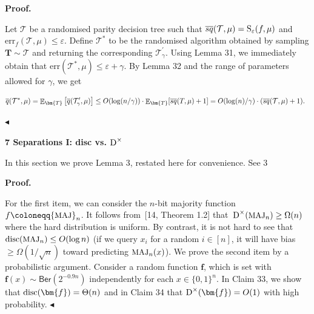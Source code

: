 \documentclass[10pt,a4paper]{article}
\begin{document}
\par\medskip\noindent\textbf{Proof.}\par




Let $\mathcal{T}$ be a randomised parity decision tree such that $\mathop{\overline{sq}}(\mathcal{T},\mu)={\textup{S}}_{\varepsilon}(f,\mu)$ and $\mathrm{err}_{f}(\mathcal{T},\mu)\leq\varepsilon$. Define $\mathcal{T}^{*}$ to be the randomised algorithm obtained by sampling $\bm{T}\sim\mathcal{T}$ and returning the corresponding $\mathcal{T}^{\prime}_{\gamma}$. Using Lemma 31, we immediately obtain that $\mathrm{err}(\mathcal{T}^{*},\mu)\leq\varepsilon+\gamma$. By Lemma 32 and the range of parameters allowed for $\gamma$, we get\par


\[\begin{gathered}
\overline{q}(\mathcal{T}^{*},\mu)=\mathop{\mathbb{E}}\nolimits_{\bm{T}}\big{[}\overline{q}(\mathcal{T}^{\prime}_{\gamma},\mu)\big{]}\leq O(\log(n/\gamma))\cdot\mathop{\mathbb{E}}\nolimits_{\bm{T}}[\mathop{\overline{sq}}(T,\mu)+1]=O(\log(n)/\gamma)\cdot(\mathop{\overline{sq}}(\mathcal{T},\mu)+1).\ \
\end{gathered}\]


$\blacktriangleleft$\par








\par\medskip\noindent\textbf{
7 Separations I: disc vs. ${\textup{D}}^{\times}$
}\par




In this section we prove Lemma 3, restated here for convenience.
See 3\par




\par\medskip\noindent\textbf{Proof.}\par




For the first item, we can consider the $n$-bit majority function $f\coloneqq{\textrm{\small{MAJ}}}_{n}$. It follows from [14, Theorem 1.2] that ${\textup{D}}^{\times}({\textrm{\small{MAJ}}}_{n})\geq\Omega(n)$ where the hard distribution is uniform. By contrast, it is not hard to see that ${\textup{disc}}({\textrm{\small{MAJ}}}_{n})\leq O(\log n)$ (if we query $x_{i}$ for a random $i\in[n]$, it will have bias $\geq\Omega(1/\sqrt{n})$ toward predicting ${\textrm{\small{MAJ}}}_{n}(x)$). We prove the second item by a probabilistic argument. Consider a random function $\bm{f}$, which is set with $\bm{f}(x)\sim\mathsf{Ber}(2^{-0.9n})$ independently for each $x\in\{0,1\}^{n}$. In Claim 33, we show that ${\textup{disc}}(\bm{f})=\Theta(n)$ and in Claim 34 that ${\textup{D}}^{\times}(\bm{f})=O(1)$ with high probability.
$\blacktriangleleft$\par
\end{document}
